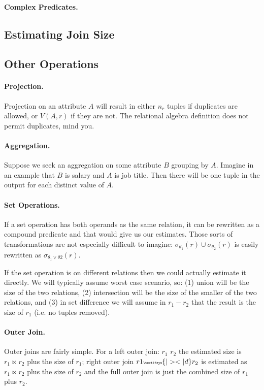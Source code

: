 \paragraph{Complex Predicates.}


\subsection*{Estimating Join Size}

\subsection*{Other Operations}

\paragraph{Projection.} Projection on an attribute $A$ will result in either $n_{r}$ tuples if duplicates are allowed, or $V(A, r)$ if they are not. The relational algebra definition does not permit duplicates, mind you.

\paragraph{Aggregation.}
Suppose we seek an aggregation on some attribute $B$ grouping by $A$. Imagine in an example that $B$ is salary and $A$ is job title. Then there will be one tuple in the output for each distinct value of $A$.

\paragraph{Set Operations.}

If a set operation has both operands as the same relation, it can be rewritten as a compound predicate and that would give us our estimates. Those sorts of transformations are not especially difficult to imagine: $\sigma_{\theta_{1}}(r) \cup \sigma_{\theta_{2}}(r)$ is easily rewritten as $\sigma_{\theta_{1} \vee \theta{2}}(r)$. 

If the set operation is on different relations then we could actually estimate it directly. We will typically assume worst case scenario, so: (1) union will be the size of the two relations, (2) intersection will be the size of the smaller of the two relations, and (3) in set difference we will assume in $r_{1} - r_{2}$ that the result is the size of $r_{1}$ (i.e. no tuples removed). 


\paragraph{Outer Join.} Outer joins are fairly simple. For a left outer join: $r_{1}$ {\tiny {}} $r_{2}$ the estimated size is $r_{1} \bowtie r_{2}$ plus the size of $r_{1}$; right outer join $r{1} {\tiny \textifsym{|><|d}} r_{2}$ is estimated as $r_{1} \bowtie r_{2}$ plus the size of $r_{2}$ and the full outer join {\tiny {}} is just the combined size of $r_{1}$ plus $r_{2}$.

